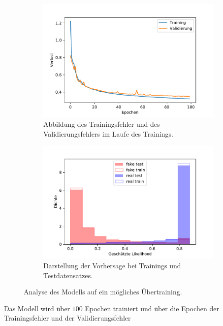 \begin{figure}[t!]
    \centering
    \begin{subfigure}[t]{0.49\textwidth}
        \centering
        \includegraphics[width=\textwidth]{pictures/history_bow_best.pdf}
        \caption{Abbildung des Trainingsfehler und des Validierungsfehlers im Laufe des Trainings.}
        \label{fig:history}
    \end{subfigure}
    \begin{subfigure}[t]{0.49\textwidth}
        \centering
        \includegraphics[width=\textwidth]{pictures/prob_bow_best_nn.pdf}
        \caption{Darstellung der Vorhersage bei Trainings und Testdatensatzes.}
        \label{fig:probs}
    \end{subfigure}
    \caption{Analyse des Modells auf ein mögliches Übertraining.}
\end{figure}
Das Modell wird über $100$ Epochen trainiert und über die Epochen der Trainingsfehler und der Validierungsfehler 
